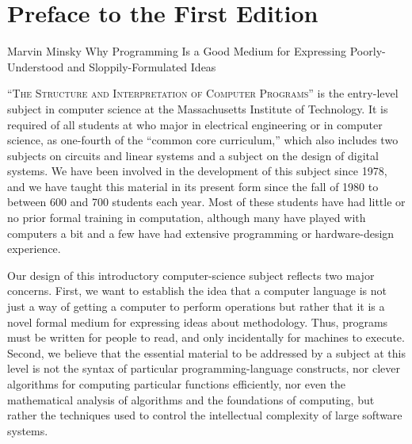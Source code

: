\chapter*{Preface to the First Edition}
\label{Preface 1e}

  {Marvin Minsky}
  {%
    Why Programming Is a Good Medium for Expressing Poorly-Understood and
    Sloppily-Formulated Ideas%
  }
  {}

\noindent
\lettrine{``T}{he Structure and Interpretation of Computer Programs''} is the entry-level
subject in computer science at the Massachusetts Institute of Technology.  It
is required of all students at  who major in electrical
engineering or in computer science, as one-fourth of the ``common core
curriculum,'' which also includes two subjects on circuits and linear systems
and a subject on the design of digital systems.  We have been involved in the
development of this subject since 1978, and we have taught this material in its
present form since the fall of 1980 to between 600 and 700 students each year.
Most of these students have had little or no prior formal training in
computation, although many have played with computers a bit and a few have had
extensive programming or hardware-design experience.

Our design of this introductory computer-science subject reflects two major
concerns.  First, we want to establish the idea that a computer language is not
just a way of getting a computer to perform operations but rather that it is a
novel formal medium for expressing ideas about methodology.  Thus, programs
must be written for people to read, and only incidentally for machines to
execute.  Second, we believe that the essential material to be addressed by a
subject at this level is not the syntax of particular programming-language
constructs, nor clever algorithms for computing particular functions
efficiently, nor even the mathematical analysis of algorithms and the
foundations of computing, but rather the techniques used to control the
intellectual complexity of large software systems.

